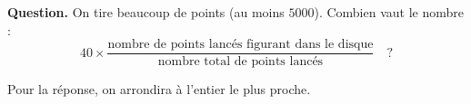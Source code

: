 \documentclass[class=report,crop=false, 12pt]{standalone}
\begin{document}
\begin{enigme}
  


\bigskip

\textbf{Question.} On tire beaucoup de points (au moins $5000$).
Combien vaut le nombre :
$$40 \times \frac{\text{nombre de points lancés figurant dans le disque}}{\text{nombre total de points lancés}} \quad ?$$

Pour la réponse, on arrondira à l'entier le plus proche.

\bigskip



\end{enigme}
\end{document}
